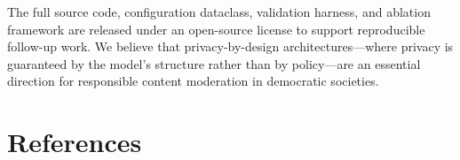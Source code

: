 \documentclass{article}
\begin{document}
The full source code, configuration dataclass, validation harness, and
ablation framework are released under an open-source license to support
reproducible follow-up work.
We believe that privacy-by-design architectures---where privacy is
guaranteed by the model's structure rather than by policy---are an
essential direction for responsible content moderation in democratic
societies.



\section*{References}
\end{document}
